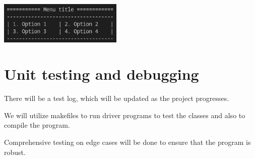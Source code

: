 \documentclass{article}
\begin{document}
  \begin{center}\includegraphics[height=2cm]{media/Menu.png}\end{center}
  
  \section{Unit testing and debugging}
  
  There will be a test log, which will be updated as the project progresses. \par
  We will utilize makefiles to run driver programs to test the classes and also to compile the program. \par 
  Comprehensive testing on edge cases will be done to ensure that the program is robust. 
    
\end{document}
